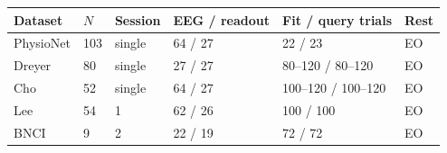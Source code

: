 \begin{tabular}{llllll}
\toprule
Dataset & $N$ & Session & EEG / readout & Fit / query trials & Rest \\
\midrule
PhysioNet & 103 & single & 64 / 27 & 22 / 23 & EO \\
Dreyer & 80 & single & 27 / 27 & 80--120 / 80--120 & EO \\
Cho & 52 & single & 64 / 27 & 100--120 / 100--120 & EO \\
Lee & 54 & 1 & 62 / 26 & 100 / 100 & EO \\
BNCI & 9 & 2 & 22 / 19 & 72 / 72 & EO \\
\bottomrule
\end{tabular}
